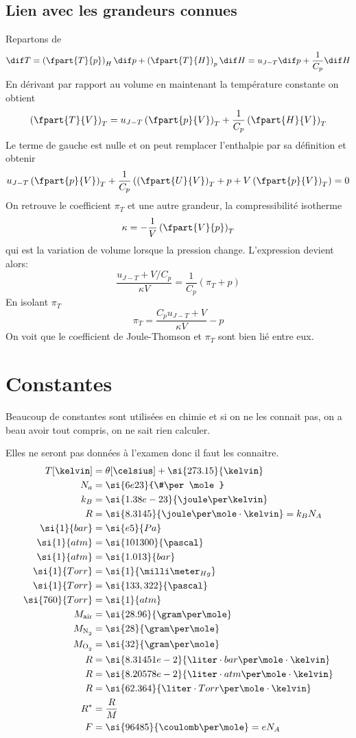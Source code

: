 \subsection{Lien avec les grandeurs connues}
Repartons de
\[ \dif T = \left ( \fpart{T}{p}\right)_H \dif p+
\left ( \fpart{T}{H}\right)_p \dif H = u_{J-T}\dif p+\frac 1{C_p}\dif H \]
En dérivant par rapport au volume en maintenant
la température constante on obtient
\[ \left ( \fpart{T}{V} \right)_T =
  u_{J-T}\left(\fpart{p}{V}\right)_T+
  \frac 1{C_p}\left(\fpart{H}{V}\right)_T \]
Le terme de gauche est nulle et on peut remplacer
l'enthalpie par sa définition et obtenir
\[ u_{J-T}\left(\fpart{p}{V}\right)_T+
  \frac 1{C_p} \left( \left(\fpart{U}{V}\right)_T+p+
  V\left(\fpart{p}{V}\right)_T\right) = 0 \]
On retrouve le coefficient $\pi_T$ et une autre grandeur,
la compressibilité isotherme
\[  \kappa = - \frac 1V \left(\fpart{V}{p}\right)_T \]
qui est la variation de volume lorsque la pression change.
L'expression devient alors:
\[ \frac{u_{J-T}+V/C_p}{\kappa V} = \frac 1{C_p}(\pi_T+p) \]
En isolant $\pi_T$
\[  \pi_T = \frac {C_p u_{J-T}+V}{\kappa V}-p \]
On voit que le coefficient de Joule-Thomson et $\pi_T$ sont bien lié entre eux.

\section{Constantes}
\label{sec:const}
Beaucoup de constantes sont utilisées en chimie et si on ne les connait pas,
on a beau avoir tout compris, on ne sait rien calculer.

Elles ne seront pas données à l'examen donc il faut les connaitre.
\begin{align*}
  T[\kelvin] & = \theta[\celsius] + \si{273.15}{\kelvin}\\
  N_a & = \si{6e23}{\#\per\mole}\\
  k_B & = \si{1.38e-23}{\joule\per\kelvin}\\
  R & = \si{8.3145}{\joule\per\mole\cdot\kelvin} = k_B N_A\\
  \si{1}{bar} & = \si{e5}{Pa}\\
  \si{1}{atm} & = \si{101300}{\pascal}\\
  \si{1}{atm} & = \si{1.013}{bar}\\
  \si{1}{Torr} & = \si{1}{\milli\meter_{Hg}}\\
  \si{1}{Torr} & = \si{133,322}{\pascal}\\
  \si{760}{Torr} & = \si{1}{atm}\\
  M_\mathrm{air} & = \si{28.96}{\gram\per\mole}\\
  M_\mathrm{\ce{N2}} & = \si{28}{\gram\per\mole}\\
  M_\mathrm{\ce{O2}} & = \si{32}{\gram\per\mole}\\
  R & = \si{8.31451e-2}{\liter\cdot bar\per\mole\cdot\kelvin}\\
  R & = \si{8.20578e-2}{\liter\cdot atm\per\mole\cdot\kelvin}\\
  R & = \si{62.364}{\liter\cdot Torr\per\mole\cdot\kelvin}\\
  R^* & = \frac{R}{M}\\
  F & = \si{96485}{\coulomb\per\mole} = eN_A
\end{align*}

